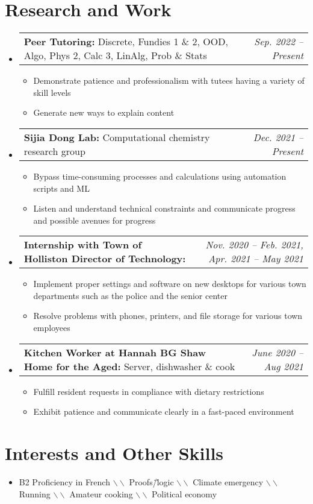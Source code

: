 \documentclass[letterpaper,11pt]{article}
\makeatletter
\newcommand{\resumeBullet}[1]{
  \item\small{
    #1 \vspace{-2pt}
  }
}
\newcommand{\resumeSubheadingThin}[3]{
  \vspace{-1pt}\item
    \begin{tabular*}{0.97\textwidth}[t]{l@{\extracolsep{\fill}}r}
      \small\textbf{#1:} #3 & \small\textit{#2} 
    \end{tabular*}\vspace{-5pt}
}
\newcommand{\summarysep}{ \textcolor{black!50}{$ \backslash \backslash $ }}
\newcommand{\resumeSubHeadingListStart}{\begin{itemize}[leftmargin=*]}
\newcommand{\resumeSubHeadingListEnd}{\end{itemize}}
\newcommand{\resumeItemListStart}{\begin{itemize}}
\newcommand{\resumeItemListEnd}{\end{itemize}\vspace{-5pt}}
\makeatother
\begin{document}
  \section{Research and Work}
  \resumeSubHeadingListStart
  \resumeSubheadingThin{Peer Tutoring}{Sep. 2022 -- Present}{Discrete, Fundies 1 \& 2, OOD, Algo, Phys 2, Calc 3, LinAlg, Prob \& Stats}
  \resumeItemListStart
    \resumeBullet{Demonstrate patience and professionalism with tutees having a variety of skill levels}
    \resumeBullet{Generate new ways to explain content}
  \resumeItemListEnd
  \resumeSubheadingThin{Sijia Dong Lab}{Dec. 2021 -- Present}{Computational chemistry research group}
  \resumeItemListStart
    \resumeBullet{Bypass time-consuming processes and calculations using automation scripts and ML}
    \resumeBullet{Listen and understand technical constraints and communicate progress and possible avenues for progress}
  \resumeItemListEnd
  \resumeSubheadingThin{Internship with Town of Holliston Director of Technology}{Nov. 2020 -- Feb. 2021, Apr. 2021 -- May 2021}{}
  \resumeItemListStart
    \resumeBullet{Implement proper settings and software on new desktops for various town departments such as the police and the senior center}
    \resumeBullet{Resolve problems with phones, printers, and file storage for various town employees}
  \resumeItemListEnd
  \resumeSubheadingThin{Kitchen Worker at Hannah BG Shaw Home for the Aged}{June 2020 -- Aug 2021}{Server, dishwasher \& cook} \resumeItemListStart
  \resumeBullet{Fulfill resident requests in compliance with dietary restrictions}
  \resumeBullet{Exhibit patience and communicate clearly in a fast-paced environment}
  \resumeItemListEnd \resumeSubHeadingListEnd

  \section{Interests and Other Skills} 
  \resumeSubHeadingListStart
    \item\small{B2 Proficiency in French \summarysep
    Proofs\./\.logic \summarysep Climate emergency \summarysep Running \summarysep Amateur cooking  \summarysep Political economy }
    \resumeSubHeadingListEnd


\end{document}
